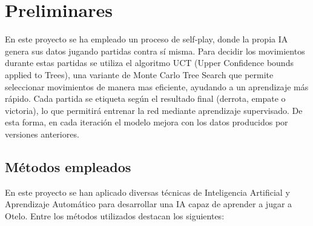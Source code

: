 \documentclass[conference,a4paper]{IEEEtran}
\begin{document}
\section{Preliminares}\label{sec:Preliminares}

En este proyecto se ha empleado un proceso de self‑play, donde la propia IA genera sus datos jugando partidas contra sí misma. Para decidir los movimientos durante estas partidas se utiliza el algoritmo UCT (Upper Confidence bounds applied to Trees), una variante de Monte Carlo Tree Search que permite seleccionar movimientos de manera mas eficiente, ayudando a un aprendizaje más rápido. Cada partida se etiqueta según el resultado final (derrota, empate o victoria), lo que permitirá entrenar la red mediante aprendizaje supervisado. De esta forma, en cada iteración el modelo mejora con los datos producidos por versiones anteriores.



\subsection{\textbf{Métodos empleados}}

En este proyecto se han aplicado diversas técnicas de Inteligencia Artificial y Aprendizaje Automático para desarrollar una IA capaz de aprender a jugar a Otelo. Entre los métodos utilizados destacan los siguientes:
\end{document}
